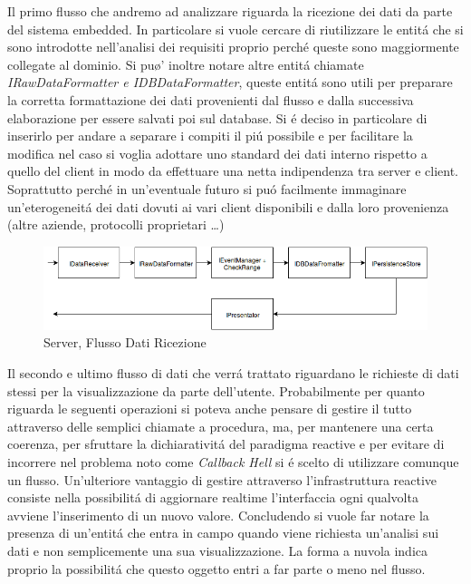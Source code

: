 Il primo flusso che andremo ad analizzare riguarda la ricezione dei dati da parte del sistema embedded. In particolare si vuole cercare di riutilizzare le entit\'a che si sono introdotte nell'analisi dei requisiti proprio perch\'e queste sono maggiormente collegate al dominio. Si pu\o' inoltre notare altre entit\'a chiamate \textit{IRawDataFormatter e IDBDataFormatter}, queste entit\'a sono utili per preparare la corretta formattazione dei dati provenienti dal flusso e dalla successiva elaborazione per essere salvati poi sul database. Si \'e deciso in particolare di inserirlo per andare a separare i compiti il pi\'u possibile e per facilitare la modifica nel caso si voglia adottare uno standard dei dati interno rispetto a quello del client in modo da effettuare una netta indipendenza tra server e client. Soprattutto perch\'e in un'eventuale futuro si pu\'o facilmente immaginare un'eterogeneit\'a dei dati dovuti ai vari client disponibili e dalla loro provenienza (altre aziende, protocolli proprietari \ldots)

\begin{figure}[h]
\centering
\includegraphics[width=\textwidth]{Figures/LogicArchitecture/Server/FlowDiagramReceiveData}
\caption{Server, Flusso Dati Ricezione}
\end{figure}

Il secondo e ultimo flusso di dati che verr\'a trattato riguardano le richieste di dati stessi per la visualizzazione da parte dell'utente. Probabilmente per quanto riguarda le seguenti operazioni si poteva anche pensare di gestire il tutto attraverso delle semplici chiamate a procedura, ma, per mantenere una certa coerenza, per sfruttare la dichiarativit\'a del paradigma reactive e per evitare di incorrere nel problema noto come \textit{Callback Hell} si \'e scelto di utilizzare comunque un flusso. Un'ulteriore vantaggio di gestire attraverso l'infrastruttura reactive consiste nella possibilit\'a di aggiornare realtime l'interfaccia ogni qualvolta avviene l'inserimento di un nuovo valore. Concludendo si vuole far notare la presenza di un'entit\'a che entra in campo quando viene richiesta un'analisi sui dati e non semplicemente una sua visualizzazione. La forma a nuvola indica proprio la possibilit\'a che questo oggetto entri a far parte o meno nel flusso.

